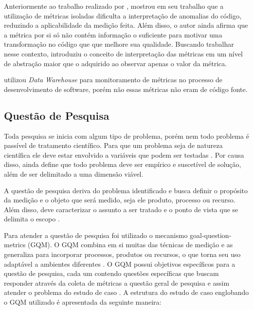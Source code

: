 Anteriormente ao trabalho realizado por ,  mostrou em seu trabalho que a utilização de métricas isoladas dificulta a interpretação de anomalias do código, reduzindo a aplicabilidade da medição feita. Além disso, o autor ainda afirma que a métrica por si só não contém informação o suficiente para motivar uma transformação no código que que melhore sua qualidade. Buscando trabalhar nesse contexto,  introduziu o conceito de interpretação das métricas em um nível de abstração maior que o adquirido ao observar apenas o valor da métrica.


 utilizou \textit{Data Warehouse} para monitoramento de métricas no processo de desenvolvimento de software, porém não essas métricas não eram de código fonte.


\subsection{Questão de Pesquisa}

Toda pesquisa se inicia com algum tipo de problema, porém nem todo problema é passível de tratamento científico. Para que um problema seja de natureza científica ele deve estar envolvido a variáveis que podem ser testadas \cite{gil_como_2002}. Por causa disso,  ainda define que todo problema deve ser empírico e suscetível de solução, além de ser delimitado a uma dimensão viável.

A questão de pesquisa deriva do problema identificado e busca definir o propósito da medição e o objeto que será medido, seja ele produto, processo ou recurso. Além disso, deve caracterizar o assunto a ser tratado e o ponto de vista que se delimita o escopo \cite{Basili96b} \cite{caldiera_goal_1994}.

Para atender a questão de pesquisa foi utilizado o mecanismo goal-question-metrics (GQM). O GQM combina em si muitas das técnicas de medição e as generaliza para incorporar processos, produtos ou recursos, o que torna seu uso adaptável a ambientes diferentes \cite{caldiera_goal_1994}. O GQM possui objetivos específicos para a questão de pesquisa, cada um contendo questões específicas que buscam responder através da coleta de métricas a questão geral de pesquisa e assim atender o problema do estudo de caso \cite{Basili96b}. A estrutura do estudo de caso englobando o GQM utilizado é apresentada da seguinte maneira:  

